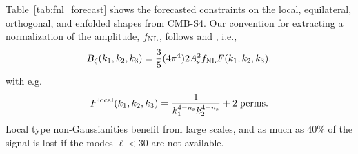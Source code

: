 
%
Table~\ref{tab:fnl_forecast} shows the forecasted constraints on the local, equilateral, orthogonal, and enfolded shapes from CMB-S4. Our convention for extracting a normalization of the amplitude, $f_{\rm NL}$, follows \cite{Babich:2004gb} and \cite{Ade:2013ydc}, i.e., 
\begin{equation}
B_{\zeta}(k_1,k_2,k_3) = \frac{3}{5} (4 \pi^4) 2 A_{\rm s}^2 f_{\rm NL} F(k_1,k_2,k_3) ,
\end{equation}
with e.g. 
\begin{equation}
F^{\rm local}(k_1,k_2,k_3) = \frac{1}{k_1^{4-n_{\rm s}}k_2^{4-n_{\rm s}}} + {\rm 2\;perms.}
\end{equation}
Local type non-Gaussianities benefit from large scales, and as much as $40\%$ of the signal is lost if the modes $\ell<30$ are not available. 
